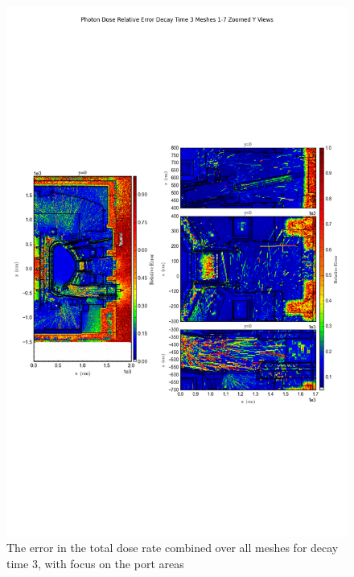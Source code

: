 \documentclass[12pt]{article}
\begin{document}
\begin{figure}[ht!]
\centering
\includegraphics[trim={0cm 9cm 0cm 10cm},clip,scale=0.75]{../plots/final_model_with_b4c/Photon_Dose_Relative_Error_Decay_Time_3_Meshes_1-7_Zoomed_Y_Views.png}
\caption{The error in the total dose rate combined over all meshes for decay time 3, with focus on the port areas}
\label{fig:photons_dc3_b4c_total_error_zoomed}
\end{figure}


\newpage
\clearpage
\end{document}
